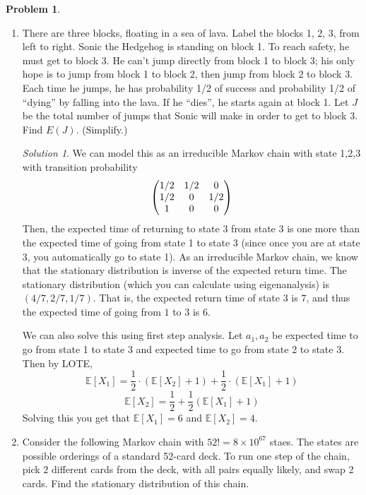 \documentclass[11pt]{article}
\theoremstyle{definition}
\newtheorem{prob}[theo]{\color{Maroon} Problem}
\theoremstyle{remark}
\newtheorem*{soln}{\color{Maroon} Solution}
\newcommand{\E}[1]{\mathbb{E}\left[ #1 \right]}
\begin{document}
\pagebreak

\begin{prob}

\begin{enumerate}[label = (\alph*)]
    \item There are three blocks, floating in a sea of lava. Label the blocks 1, 2, 3, from left to right. Sonic the Hedgehog is standing on block 1. To reach safety, he must get to block 3. He can't jump directly from block 1 to block 3; his only hope is to jump from block 1 to block 2, then jump from block 2 to block 3. Each time he jumps, he has probability 1/2 of success and probability 1/2 of ``dying'' by falling into the lava. If he ``dies'', he starts again at block 1. Let $J$ be the total number of jumps that Sonic will make in order to get to block 3. Find $E(J)$. (Simplify.)
    
    \begin{soln}
    
    We can model this as an irreducible Markov chain with state 1,2,3 with transition probability $$\pmqty{1/2 & 1/2 & 0 \\ 1/2 & 0 & 1/2 \\ 1 & 0 & 0}$$ Then, the expected time of returning to state 3 from state 3 is one more than the expected time of going from state 1 to state 3 (since once you are at state 3, you automatically go to state 1). As an irreducible Markov chain, we know that the stationary distribution is inverse of the expected return time. The stationary distribution (which you can calculate using eigenanalysis) is $(4/7,2/7,1/7)$. That is, the expected return time of state 3 is $7$, and thus the expected time of going from $1$ to $3$ is $6$. 
    
    We can also solve this using first step analysis. Let $a_1,a_2$ be expected time to go from state 1 to state 3 and expected time to go from state 2 to state 3. Then by LOTE, $$\E{X_1} = \frac{1}{2} \cdot (\E{X_2}+1) + \frac{1}{2} \cdot (\E{X_1}+1) $$ $$ \E{X_2} = \frac{1}{2} + \frac{1}{2} (\E{X_1}+1) $$ Solving this you get that $\E{X_1} = 6$ and $\E{X_2} = 4$. 
    
    \end{soln} 
    
    \dotfill
    
    \item Consider the following Markov chain with $52! = 8 \times 10^{67}$ staes. The states are possible orderings of a standard 52-card deck. To run one step of the chain, pick $2$ different cards from the deck, with all pairs equally likely, and swap 2 cards. Find the stationary distribution of this chain.
    

\end{enumerate}
\end{prob}
\end{document}
